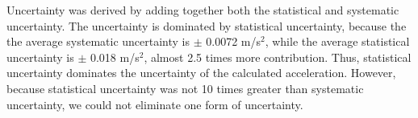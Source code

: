 \documentclass[11pt]{report}
\begin{document}
Uncertainty was derived by adding together both the statistical and systematic
uncertainty. The uncertainty is dominated by statistical uncertainty, because
the the average systematic uncertainty is $\pm$ 0.0072 m/s$^2$, while the average
statistical uncertainty is $\pm$ 0.018 m/s$^2$, almost 2.5 times more
contribution.  Thus, statistical uncertainty dominates the uncertainty of the
calculated acceleration. However, because statistical uncertainty was not 10
times greater than systematic uncertainty, we could not eliminate one form of
uncertainty.
\end{document}
